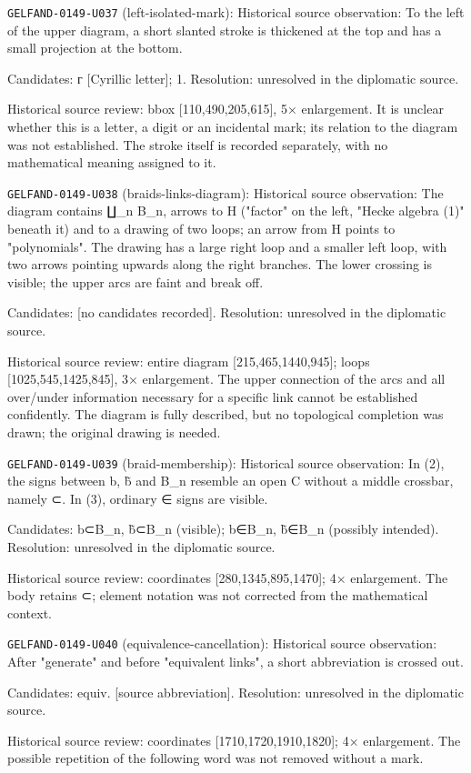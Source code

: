 \noindent\texttt{GELFAND-0149-U037} (left-isolated-mark): Historical source observation: To the left of the upper diagram, a short slanted stroke is thickened at the top and has a small projection at the bottom.\par
Candidates: г [Cyrillic letter]; 1. Resolution: unresolved in the diplomatic source.\par
Historical source review: bbox [110,490,205,615], 5× enlargement. It is unclear whether this is a letter, a digit or an incidental mark; its relation to the diagram was not established. The stroke itself is recorded separately, with no mathematical meaning assigned to it.\par

\noindent\texttt{GELFAND-0149-U038} (braids-links-diagram): Historical source observation: The diagram contains ∐\_n B\_n, arrows to H ("factor" on the left, "Hecke algebra (1)" beneath it) and to a drawing of two loops; an arrow from H points to "polynomials". The drawing has a large right loop and a smaller left loop, with two arrows pointing upwards along the right branches. The lower crossing is visible; the upper arcs are faint and break off.\par
Candidates: [no candidates recorded]. Resolution: unresolved in the diplomatic source.\par
Historical source review: entire diagram [215,465,1440,945]; loops [1025,545,1425,845], 3× enlargement. The upper connection of the arcs and all over/under information necessary for a specific link cannot be established confidently. The diagram is fully described, but no topological completion was drawn; the original drawing is needed.\par

\noindent\texttt{GELFAND-0149-U039} (braid-membership): Historical source observation: In (2), the signs between b, b̃ and B\_n resemble an open C without a middle crossbar, namely ⊂. In (3), ordinary ∈ signs are visible.\par
Candidates: b⊂B\_n, b̃⊂B\_n (visible); b∈B\_n, b̃∈B\_n (possibly intended). Resolution: unresolved in the diplomatic source.\par
Historical source review: coordinates [280,1345,895,1470]; 4× enlargement. The body retains ⊂; element notation was not corrected from the mathematical context.\par

\noindent\texttt{GELFAND-0149-U040} (equivalence-cancellation): Historical source observation: After "generate" and before "equivalent links", a short abbreviation is crossed out.\par
Candidates: equiv. [source abbreviation]. Resolution: unresolved in the diplomatic source.\par
Historical source review: coordinates [1710,1720,1910,1820]; 4× enlargement. The possible repetition of the following word was not removed without a mark.\par

